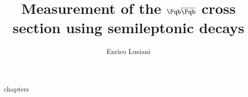 \documentclass[10pt]{beamer}
\title[Measurement of \xsec{$\Pqb\overline{\Pqb}}$] %
{Measurement of the $\Pqb\overline{\Pqb}$ cross section using semileptonic decays}
\author[Enrico Lusiani]%
{
	Enrico Lusiani\\[1ex]
}
\begin{document}
\frame{\titlepage}

{chapters}
\end{document}
